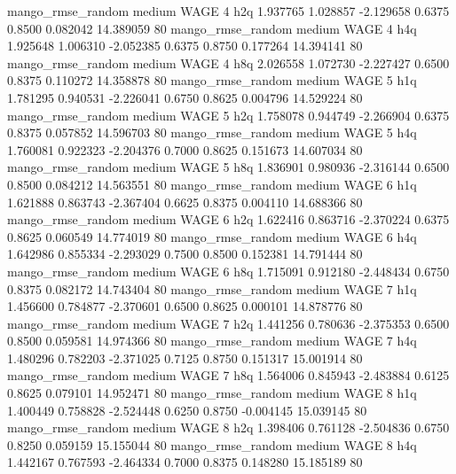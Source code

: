 mango_rmse_random     medium     WAGE                 4                  h2q  1.937765 1.028857 -2.129658 0.6375 0.8500  0.082042   14.389059 80
mango_rmse_random     medium     WAGE                 4                  h4q  1.925648 1.006310 -2.052385 0.6375 0.8750  0.177264   14.394141 80
mango_rmse_random     medium     WAGE                 4                  h8q  2.026558 1.072730 -2.227427 0.6500 0.8375  0.110272   14.358878 80
mango_rmse_random     medium     WAGE                 5                  h1q  1.781295 0.940531 -2.226041 0.6750 0.8625  0.004796   14.529224 80
mango_rmse_random     medium     WAGE                 5                  h2q  1.758078 0.944749 -2.266904 0.6375 0.8375  0.057852   14.596703 80
mango_rmse_random     medium     WAGE                 5                  h4q  1.760081 0.922323 -2.204376 0.7000 0.8625  0.151673   14.607034 80
mango_rmse_random     medium     WAGE                 5                  h8q  1.836901 0.980936 -2.316144 0.6500 0.8500  0.084212   14.563551 80
mango_rmse_random     medium     WAGE                 6                  h1q  1.621888 0.863743 -2.367404 0.6625 0.8375  0.004110   14.688366 80
mango_rmse_random     medium     WAGE                 6                  h2q  1.622416 0.863716 -2.370224 0.6375 0.8625  0.060549   14.774019 80
mango_rmse_random     medium     WAGE                 6                  h4q  1.642986 0.855334 -2.293029 0.7500 0.8500  0.152381   14.791444 80
mango_rmse_random     medium     WAGE                 6                  h8q  1.715091 0.912180 -2.448434 0.6750 0.8375  0.082172   14.743404 80
mango_rmse_random     medium     WAGE                 7                  h1q  1.456600 0.784877 -2.370601 0.6500 0.8625  0.000101   14.878776 80
mango_rmse_random     medium     WAGE                 7                  h2q  1.441256 0.780636 -2.375353 0.6500 0.8500  0.059581   14.974366 80
mango_rmse_random     medium     WAGE                 7                  h4q  1.480296 0.782203 -2.371025 0.7125 0.8750  0.151317   15.001914 80
mango_rmse_random     medium     WAGE                 7                  h8q  1.564006 0.845943 -2.483884 0.6125 0.8625  0.079101   14.952471 80
mango_rmse_random     medium     WAGE                 8                  h1q  1.400449 0.758828 -2.524448 0.6250 0.8750 -0.004145   15.039145 80
mango_rmse_random     medium     WAGE                 8                  h2q  1.398406 0.761128 -2.504836 0.6750 0.8250  0.059159   15.155044 80
mango_rmse_random     medium     WAGE                 8                  h4q  1.442167 0.767593 -2.464334 0.7000 0.8375  0.148280   15.185189 80
